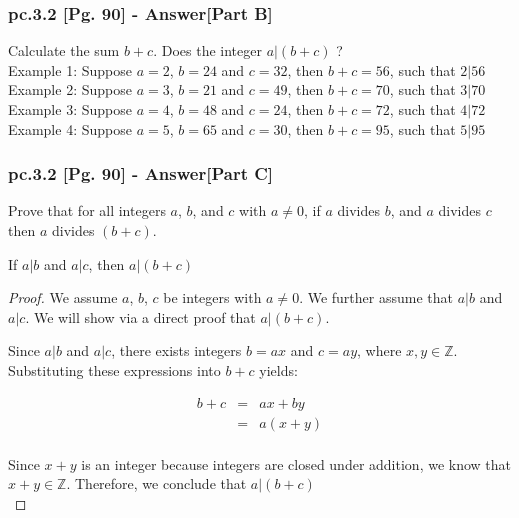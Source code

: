 \subsubsection*{pc.3.2 [Pg. 90] - Answer[Part B]}
Calculate the sum $b + c$. Does the integer $a | (b+c)$ ? \\
Example 1: Suppose $a = 2$, $b = 24$ and $c = 32$, then $b + c = 56$, such that $2 | 56$\\
Example 2: Suppose $a = 3$, $b = 21$ and $c = 49$, then $b + c = 70$, such that $3 | 70$\\
Example 3: Suppose $a = 4$, $b = 48$ and $c = 24$, then $b + c = 72$, such that $4 | 72$\\
Example 4: Suppose $a = 5$, $b = 65$ and $c = 30$, then $b + c = 95$, such that $5 | 95$\\


\subsubsection*{pc.3.2 [Pg. 90] - Answer[Part C]}
Prove that for all integers $a$, $b$, and $c$ with $a \neq 0$, if $a$ divides $b$, and $a$ divides $c$ then $a$ divides $(b+c)$. \\

\begin{tcolorbox}
	\begin{theorem}
		If $a | b$ and $a | c$, then $a | (b + c)$
	\end{theorem}
\end{tcolorbox}

\begin{proof}
We assume $a$, $b$, $c$ be integers with $a \neq 0$. We further assume that $a | b$ and $a | c$. We will show via a direct proof that $a | (b + c)$. 

Since $a | b$ and $a | c$, there exists integers $b = ax$ and $c = ay$, where $x, y \in \mathbb{Z}$. Substituting these expressions into $b + c$ yields:

\begin{eqnarray*}
	b + c & = & ax + by \nonumber \\	
	& = & a(x + y) \nonumber \\
\end{eqnarray*}

Since $x + y$ is an integer because integers are closed under addition, we know that $x + y \in \mathbb{Z}$. Therefore, we conclude that $a | (b + c)$ \\
\end{proof}


